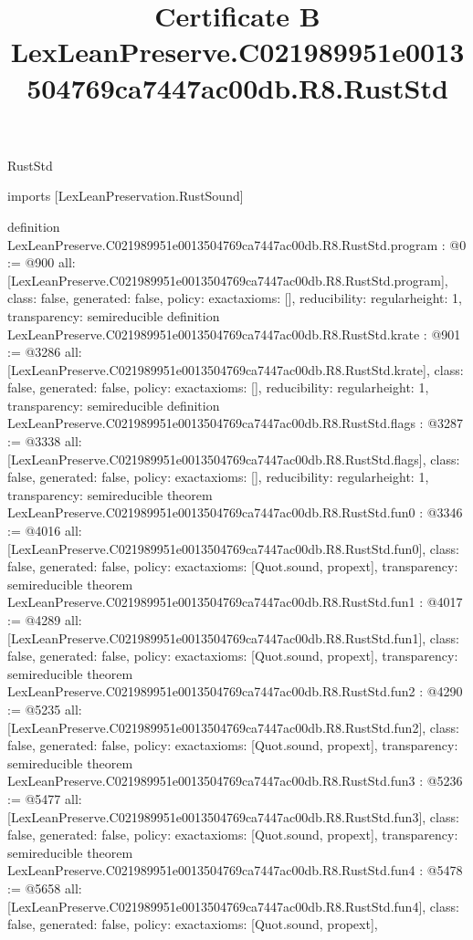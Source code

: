 \begin{lexlean}{RustStd}
\title{Certificate B LexLeanPreserve.C021989951e0013504769ca7447ac00db.R8.RustStd}
\begin{coremodule}
imports [LexLeanPreservation.RustSound]

definition LexLeanPreserve.C021989951e0013504769ca7447ac00db.R8.RustStd.program : @0 := @900 {
  all: [LexLeanPreserve.C021989951e0013504769ca7447ac00db.R8.RustStd.program],
  class: false,
  generated: false,
  policy: exact{axioms: []},
  reducibility: regular{height: 1},
  transparency: semireducible
}
definition LexLeanPreserve.C021989951e0013504769ca7447ac00db.R8.RustStd.krate : @901 := @3286 {
  all: [LexLeanPreserve.C021989951e0013504769ca7447ac00db.R8.RustStd.krate],
  class: false,
  generated: false,
  policy: exact{axioms: []},
  reducibility: regular{height: 1},
  transparency: semireducible
}
definition LexLeanPreserve.C021989951e0013504769ca7447ac00db.R8.RustStd.flags : @3287 := @3338 {
  all: [LexLeanPreserve.C021989951e0013504769ca7447ac00db.R8.RustStd.flags],
  class: false,
  generated: false,
  policy: exact{axioms: []},
  reducibility: regular{height: 1},
  transparency: semireducible
}
theorem LexLeanPreserve.C021989951e0013504769ca7447ac00db.R8.RustStd.fun0 : @3346 := @4016 {
  all: [LexLeanPreserve.C021989951e0013504769ca7447ac00db.R8.RustStd.fun0],
  class: false,
  generated: false,
  policy: exact{axioms: [Quot.sound, propext]},
  transparency: semireducible
}
theorem LexLeanPreserve.C021989951e0013504769ca7447ac00db.R8.RustStd.fun1 : @4017 := @4289 {
  all: [LexLeanPreserve.C021989951e0013504769ca7447ac00db.R8.RustStd.fun1],
  class: false,
  generated: false,
  policy: exact{axioms: [Quot.sound, propext]},
  transparency: semireducible
}
theorem LexLeanPreserve.C021989951e0013504769ca7447ac00db.R8.RustStd.fun2 : @4290 := @5235 {
  all: [LexLeanPreserve.C021989951e0013504769ca7447ac00db.R8.RustStd.fun2],
  class: false,
  generated: false,
  policy: exact{axioms: [Quot.sound, propext]},
  transparency: semireducible
}
theorem LexLeanPreserve.C021989951e0013504769ca7447ac00db.R8.RustStd.fun3 : @5236 := @5477 {
  all: [LexLeanPreserve.C021989951e0013504769ca7447ac00db.R8.RustStd.fun3],
  class: false,
  generated: false,
  policy: exact{axioms: [Quot.sound, propext]},
  transparency: semireducible
}
theorem LexLeanPreserve.C021989951e0013504769ca7447ac00db.R8.RustStd.fun4 : @5478 := @5658 {
  all: [LexLeanPreserve.C021989951e0013504769ca7447ac00db.R8.RustStd.fun4],
  class: false,
  generated: false,
  policy: exact{axioms: [Quot.sound, propext]},
}
\end{coremodule}
\end{lexlean}
